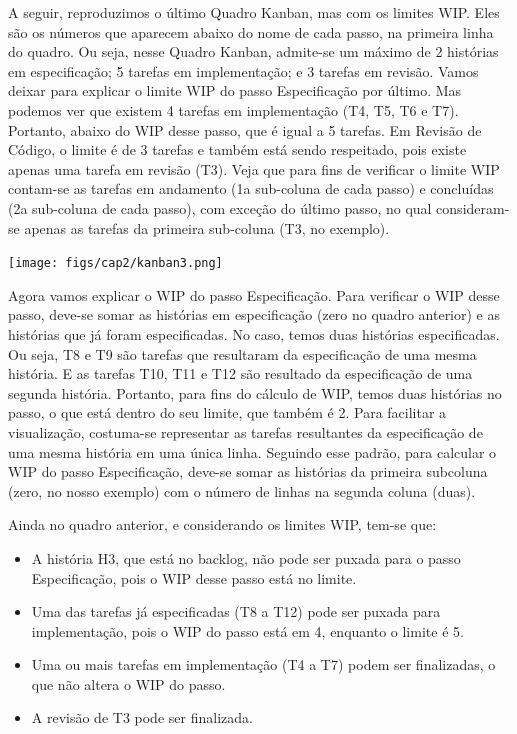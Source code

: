 \documentclass[
  11pt,
  twoside]{book}
\begin{document}
A seguir, reproduzimos o último Quadro Kanban, mas com os limites WIP.
Eles são os números que aparecem abaixo do nome de cada passo, na
primeira linha do quadro. Ou seja, nesse Quadro Kanban, admite-se um
máximo de 2 histórias em especificação; 5 tarefas em implementação; e 3
tarefas em revisão. Vamos deixar para explicar o limite WIP do passo
Especificação por último. Mas podemos ver que existem 4 tarefas em
implementação (T4, T5, T6 e T7). Portanto, abaixo do WIP desse passo,
que é igual a 5 tarefas. Em Revisão de Código, o limite é de 3 tarefas e
também está sendo respeitado, pois existe apenas uma tarefa em revisão
(T3). Veja que para fins de verificar o limite WIP contam-se as tarefas
em andamento (1a sub-coluna de cada passo) e concluídas (2a sub-coluna
de cada passo), com exceção do último passo, no qual consideram-se
apenas as tarefas da primeira sub-coluna (T3, no exemplo).

\texttt{[image: figs/cap2/kanban3.png]}

Agora vamos explicar o WIP do passo Especificação. Para verificar o WIP
desse passo, deve-se somar as histórias em especificação (zero no quadro
anterior) e as histórias que já foram especificadas. No caso, temos duas
histórias especificadas. Ou seja, T8 e T9 são tarefas que resultaram da
especificação de uma mesma história. E as tarefas T10, T11 e T12 são
resultado da especificação de uma segunda história. Portanto, para fins
do cálculo de WIP, temos duas histórias no passo, o que está dentro do
seu limite, que também é 2. Para facilitar a visualização, costuma-se
representar as tarefas resultantes da especificação de uma mesma
história em uma única linha. Seguindo esse padrão, para calcular o WIP
do passo Especificação, deve-se somar as histórias da primeira subcoluna
(zero, no nosso exemplo) com o número de linhas na segunda coluna
(duas).

Ainda no quadro anterior, e considerando os limites WIP, tem-se que:

\begin{itemize}
\item
  A história H3, que está no backlog, não pode ser puxada para o passo
  Especificação, pois o WIP desse passo está no limite.
\item
  Uma das tarefas já especificadas (T8 a T12) pode ser puxada para
  implementação, pois o WIP do passo está em 4, enquanto o limite é 5.
\item
  Uma ou mais tarefas em implementação (T4 a T7) podem ser finalizadas,
  o que não altera o WIP do passo.
\item
  A revisão de T3 pode ser finalizada.
\end{itemize}
\end{document}
